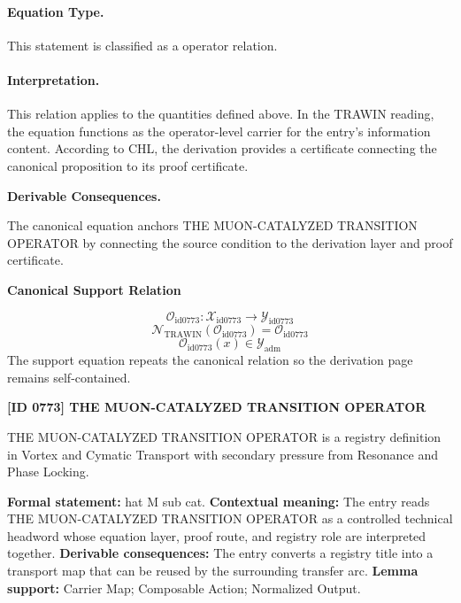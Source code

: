 \paragraph{Equation Type.}
This statement is classified as a operator relation.

\paragraph{Interpretation.}
This relation applies to the quantities defined above. In the TRAWIN reading, the equation functions as the operator-level carrier for the entry’s information content. According to CHL, the derivation provides a certificate connecting the canonical proposition to its proof certificate.

\par\vspace{0.35em}
\noindent\textbf{Derivable Consequences.}\quad
\begingroup
\footnotesize
\raggedright
The canonical equation anchors THE MUON-CATALYZED TRANSITION OPERATOR by connecting the source condition to the derivation layer and proof certificate.
\par\endgroup

\noindent\textbf{Canonical Support Relation}\par
\[
\mathcal{O}_{\mathrm{id0773}}:\mathcal{X}_{\mathrm{id0773}}\longrightarrow\mathcal{Y}_{\mathrm{id0773}}
\]
\[
\mathcal{N}_{\mathrm{TRAWIN}}(\mathcal{O}_{\mathrm{id0773}})=\mathcal{O}_{\mathrm{id0773}}
\]
\[
\mathcal{O}_{\mathrm{id0773}}(x)\in\mathcal{Y}_{\mathrm{adm}}
\]
\noindent The support equation repeats the canonical relation so the derivation page remains self-contained.\par

\clearpage
\noindent\textbf{[ID 0773] THE MUON-CATALYZED TRANSITION OPERATOR}\par
\vspace{0.35em}
\begingroup\small
{}
THE MUON-CATALYZED TRANSITION OPERATOR is a registry definition in Vortex and Cymatic Transport with secondary pressure from Resonance and Phase Locking.

\begingroup\footnotesize\setlength{\emergencystretch}{3em}\sloppy
\textbf{Formal statement:} hat M sub cat. \textbf{Contextual meaning:} The entry reads THE MUON-CATALYZED TRANSITION OPERATOR as a controlled technical headword whose equation layer, proof route, and registry role are interpreted together. \textbf{Derivable consequences:} The entry converts a registry title into a transport map that can be reused by the surrounding transfer arc. \textbf{Lemma support:} Carrier Map; Composable Action; Normalized Output.\par
\endgroup

